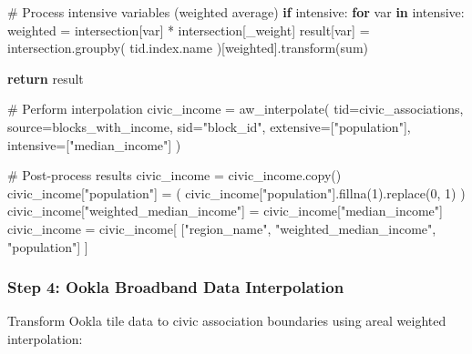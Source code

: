 \documentclass[
  letterpaper,
  DIV=11,
  numbers=noendperiod]{scrartcl}
\newenvironment{Shaded}{\begin{snugshade}}{\end{snugshade}}
\newcommand{\CommentTok}[1]{\textcolor[rgb]{0.37,0.37,0.37}{#1}}
\newcommand{\ControlFlowTok}[1]{\textcolor[rgb]{0.00,0.23,0.31}{\textbf{#1}}}
\newcommand{\DecValTok}[1]{\textcolor[rgb]{0.68,0.00,0.00}{#1}}
\newcommand{\KeywordTok}[1]{\textcolor[rgb]{0.00,0.23,0.31}{\textbf{#1}}}
\newcommand{\NormalTok}[1]{\textcolor[rgb]{0.00,0.23,0.31}{#1}}
\newcommand{\OperatorTok}[1]{\textcolor[rgb]{0.37,0.37,0.37}{#1}}
\newcommand{\StringTok}[1]{\textcolor[rgb]{0.13,0.47,0.30}{#1}}
\begin{document}
\begin{Shaded}
\begin{Highlighting}[]
    \CommentTok{\# Process intensive variables (weighted average)}
    \ControlFlowTok{if}\NormalTok{ intensive:}
        \ControlFlowTok{for}\NormalTok{ var }\KeywordTok{in}\NormalTok{ intensive:}
\NormalTok{            weighted }\OperatorTok{=}\NormalTok{ intersection[var] }\OperatorTok{*}\NormalTok{ intersection[}\StringTok{\textquotesingle{}\_weight\textquotesingle{}}\NormalTok{]}
\NormalTok{            result[var] }\OperatorTok{=}\NormalTok{ intersection.groupby(}
\NormalTok{                tid.index.name}
\NormalTok{            )[weighted].transform(}\StringTok{\textquotesingle{}sum\textquotesingle{}}\NormalTok{)}

    \ControlFlowTok{return}\NormalTok{ result}

\CommentTok{\# Perform interpolation}
\NormalTok{civic\_income }\OperatorTok{=}\NormalTok{ aw\_interpolate(}
\NormalTok{    tid}\OperatorTok{=}\NormalTok{civic\_associations,}
\NormalTok{    source}\OperatorTok{=}\NormalTok{blocks\_with\_income,}
\NormalTok{    sid}\OperatorTok{=}\StringTok{"block\_id"}\NormalTok{,}
\NormalTok{    extensive}\OperatorTok{=}\NormalTok{[}\StringTok{"population"}\NormalTok{],}
\NormalTok{    intensive}\OperatorTok{=}\NormalTok{[}\StringTok{"median\_income"}\NormalTok{]}
\NormalTok{)}

\CommentTok{\# Post{-}process results}
\NormalTok{civic\_income }\OperatorTok{=}\NormalTok{ civic\_income.copy()}
\NormalTok{civic\_income[}\StringTok{"population"}\NormalTok{] }\OperatorTok{=}\NormalTok{ (}
\NormalTok{    civic\_income[}\StringTok{"population"}\NormalTok{].fillna(}\DecValTok{1}\NormalTok{).replace(}\DecValTok{0}\NormalTok{, }\DecValTok{1}\NormalTok{)}
\NormalTok{)}
\NormalTok{civic\_income[}\StringTok{"weighted\_median\_income"}\NormalTok{] }\OperatorTok{=}\NormalTok{ civic\_income[}\StringTok{"median\_income"}\NormalTok{]}
\NormalTok{civic\_income }\OperatorTok{=}\NormalTok{ civic\_income[}
\NormalTok{    [}\StringTok{"region\_name"}\NormalTok{, }\StringTok{"weighted\_median\_income"}\NormalTok{, }\StringTok{"population"}\NormalTok{]}
\NormalTok{]}
\end{Highlighting}
\end{Shaded}

\subsubsection{Step 4: Ookla Broadband Data
Interpolation}\label{step-4-ookla-broadband-data-interpolation}

Transform Ookla tile data to civic association boundaries using areal
weighted interpolation:
\end{document}
